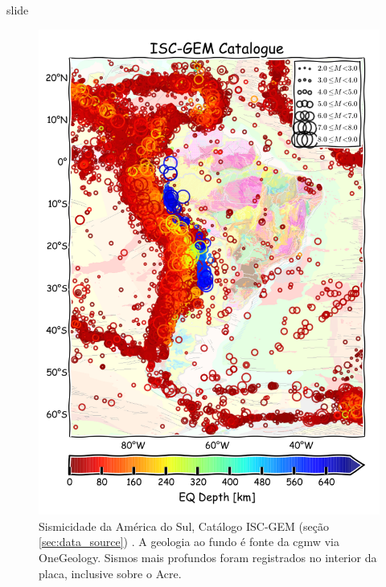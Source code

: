\documentclass[ucs,8pt]{beamer}
\begin{document}
\begin{frame}{slide}

\begin{figure}[H]
  \centering
  \includegraphics[height=.70\textheight]{seismicity_sa} 
  \caption{Sismicidade da América do Sul, Catálogo ISC-GEM (seção \ref{sec:data_source}) . 
  			A geologia ao fundo é fonte da \gls{cgmw} via OneGeology.
		   Sismos mais profundos foram registrados no interior da placa, inclusive sobre o Acre.
  		   }
  \label{fig:sa_seis} 
\end{figure}


\end{frame}
\end{document}
